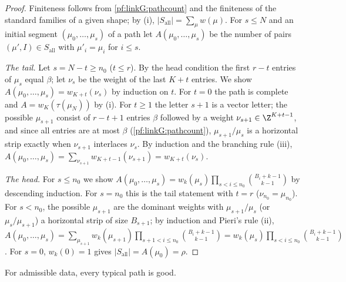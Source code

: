 \begin{proof}
Finiteness follows from \cref{pf:linkG:pathcount} and the finiteness of the standard families of a given shape; by (i),
$|S_{\mathrm{all}}|=\sum_\mu w(\mu)$. For $s\le N$ and an initial segment $(\mu_0,\dots,\mu_s)$ of a path let $A(\mu_0,\dots,\mu_s)$ be the
number of pairs $(\mu',I)\in S_{\mathrm{all}}$ with $\mu'_i=\mu_i$ for $i\le s$.

\emph{The tail.} Let $s=N-t\ge n_0$ ($t\le r$). By the head condition the first $r-t$ entries of $\mu_s$ equal $\beta$; let $\nu_s$ be
the weight of the last $K+t$ entries. We show $A(\mu_0,\dots,\mu_s)=w_{K+t}(\nu_s)$ by induction on $t$. For $t=0$ the path is
complete and $A=w_K(\tau(\mu_N))$ by (i). For $t\ge1$ the letter $s+1$ is a vector letter; the possible $\mu_{s+1}$ consist of
$r-t+1$ entries $\beta$ followed by a weight $\nu_{s+1}\in\Z^{K+t-1}$, and since all entries are at most $\beta$
(\cref{pf:linkG:pathcount}), $\mu_{s+1}/\mu_s$ is a horizontal strip exactly when $\nu_{s+1}$ interlaces $\nu_s$. By induction and
the branching rule (iii), $A(\mu_0,\dots,\mu_s)=\sum_{\nu_{s+1}}w_{K+t-1}(\nu_{s+1})=w_{K+t}(\nu_s)$.

\emph{The head.} For $s\le n_0$ we show $A(\mu_0,\dots,\mu_s)=w_k(\mu_s)\prod_{s<i\le n_0}\binom{B_i+k-1}{k-1}$ by descending
induction. For $s=n_0$ this is the tail statement with $t=r$ ($\nu_{n_0}=\mu_{n_0}$). For $s<n_0$, the possible $\mu_{s+1}$ are
the dominant weights with $\mu_{s+1}/\mu_s$ (or $\mu_s/\mu_{s+1}$) a horizontal strip of size $B_{s+1}$; by induction and Pieri's
rule (ii), $A(\mu_0,\dots,\mu_s)=\sum_{\mu_{s+1}}w_k(\mu_{s+1})\prod_{s+1<i\le n_0}\binom{B_i+k-1}{k-1}
=w_k(\mu_s)\prod_{s<i\le n_0}\binom{B_i+k-1}{k-1}$. For $s=0$, $w_k(0)=1$ gives $|S_{\mathrm{all}}|=A(\mu_0)=\rho$.
\end{proof}

\begin{lemma}\label{pf:linkG:typicalgood}
For admissible data, every typical path is good.
\end{lemma}

